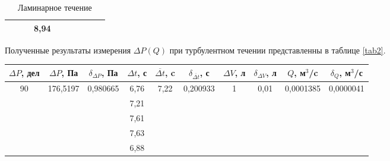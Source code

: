\documentclass[a4paper, 12pt]{article}
\begin{document}
\begin{table}[h!]
\begin{tabular}{|c|c|c|c|c|c|c|c|c|c|}
                    &                           &                           & 8,94           &                           &                                    &                    &                         &                            &                               \\ \hline
\end{tabular}
\caption{Ламинарное течение}
\label{tab1}
\end{table}

\newpage
\par Полученные результаты измерения $\Delta{P}(Q)$ при турбулентном течении представленны в таблице \ref{tab2}.
\begin{table}[h!]
\begin{tabular}{|c|c|c|c|c|c|c|c|c|c|}
\hline
$\Delta{P}$, дел     & $\Delta{P}$, Па           & $\delta_{\Delta{P}}$, Па  & $\Delta{t}$, с & $\overline{\Delta{t}}$, c & $\delta_{\overline{\Delta{t}}}$, с & $\Delta{V}$, л     & $\delta_{\Delta{V}}$, л & $Q$, м$^3$/c      & $\delta_{Q}$, м$^3$/с \\ \hline
\multirow{5}{*}{90}  & \multirow{5}{*}{176,5197} & \multirow{5}{*}{0,980665} & 6,76           & \multirow{5}{*}{7,22}     & \multirow{5}{*}{0,200933}          & \multirow{5}{*}{1} & \multirow{5}{*}{0,01}   & \multirow{5}{*}{0,0001385} & \multirow{5}{*}{0,0000041}    \\ \cline{4-4}
                     &                           &                           & 7,21           &                           &                                    &                    &                         &                            &                               \\ \cline{4-4}
                     &                           &                           & 7,61           &                           &                                    &                    &                         &                            &                               \\ \cline{4-4}
                     &                           &                           & 7,63           &                           &                                    &                    &                         &                            &                               \\ \cline{4-4}
                     &                           &                           & 6,88           &                           &                                    &                    &                         &                            &                               \\ \hline

\end{tabular}
\end{table}
\end{document}
